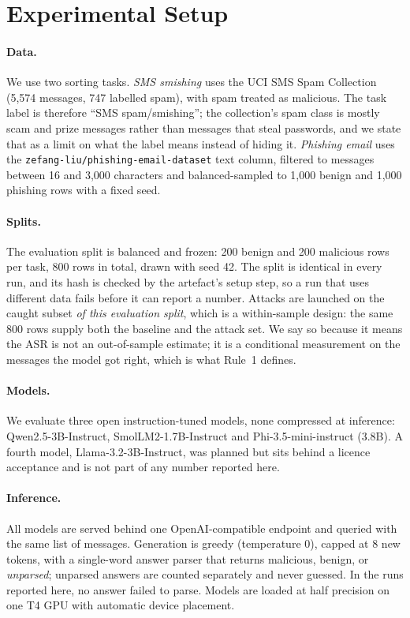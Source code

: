 \section{Experimental Setup}
\label{sec:setup}

\paragraph{Data.}
We use two sorting tasks. \emph{SMS smishing} uses the UCI SMS Spam Collection
(5{,}574 messages, 747 labelled spam), with spam treated as malicious. The task
label is therefore ``SMS spam/smishing''; the collection's spam class is mostly
scam and prize messages rather than messages that steal passwords, and we state
that as a limit on what the label means instead of hiding it.
\emph{Phishing email} uses the \texttt{zefang-liu/phishing-email-dataset} text
column, filtered to messages between 16 and 3{,}000 characters and
balanced-sampled to 1{,}000 benign and 1{,}000 phishing rows with a fixed seed.

\paragraph{Splits.}
The evaluation split is balanced and frozen: 200 benign and 200 malicious rows
per task, 800 rows in total, drawn with seed 42. The split is identical in every
run, and its hash is checked by the artefact's setup step, so a run that uses
different data fails before it can report a number. Attacks are launched on the
caught subset \emph{of this evaluation split}, which is a within-sample design:
the same 800 rows supply both the baseline and the attack set. We say so because
it means the ASR is not an out-of-sample estimate; it is a conditional
measurement on the messages the model got right, which is what Rule~1 defines.

\paragraph{Models.}
We evaluate three open instruction-tuned models, none compressed at inference:
Qwen2.5-3B-Instruct, SmolLM2-1.7B-Instruct and Phi-3.5-mini-instruct (3.8B). A
fourth model, Llama-3.2-3B-Instruct, was planned but sits behind a licence
acceptance and is not part of any number reported here.

\paragraph{Inference.}
All models are served behind one OpenAI-compatible endpoint and queried with the
same list of messages. Generation is greedy (temperature 0), capped at 8 new
tokens, with a single-word answer parser that returns malicious, benign, or
\emph{unparsed}; unparsed answers are counted separately and never guessed. In
the runs reported here, no answer failed to parse. Models are loaded at half
precision on one T4 GPU with automatic device placement.

